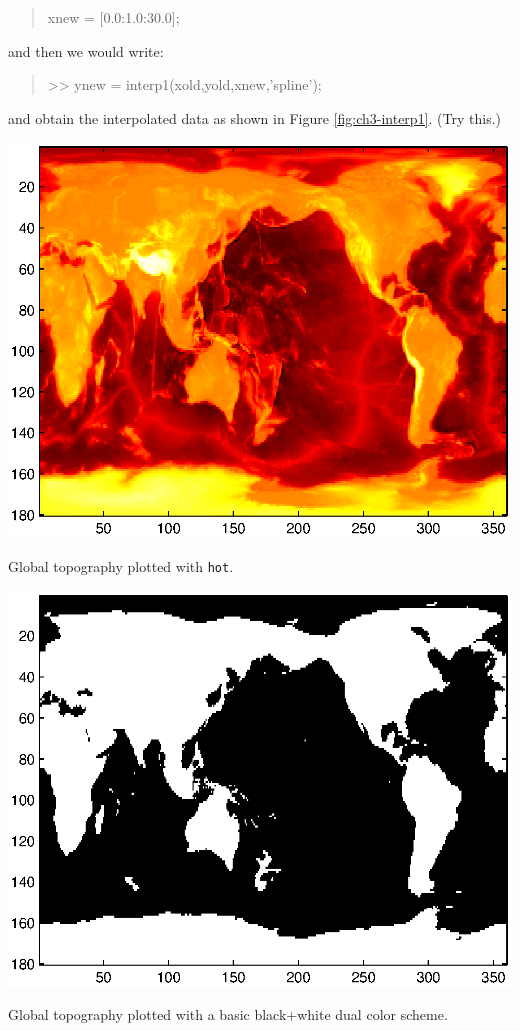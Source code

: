 \documentclass{tufte-book} %
\newenvironment{docspec}{\begin{quotation}\ttfamily\parskip0pt\parindent0pt\ignorespaces}{\end{quotation}}
\begin{document}
\begin{docspec}
xnew = [0.0:1.0:30.0];
\end{docspec}

\noindent and then we would write:

\begin{docspec}
>> ynew = interp1(xold,yold,xnew,'spline');
\end{docspec}

\noindent and obtain the interpolated data as shown in Figure \ref{fig:ch3-interp1}. (Try this.)

\begin{marginfigure}[-5.0in]
\includegraphics[width=\linewidth]{ch3-etopo4.eps}
\caption{Global topography plotted with \texttt{hot}.}
\label{fig:ch3-etopo4}
\end{marginfigure}

\begin{marginfigure}[-0.0in]
\includegraphics[width=\linewidth]{ch3-etopo5.eps}
\caption{Global topography plotted with a basic black+white dual color scheme.}
\label{fig:ch3-etopo5}
\end{marginfigure}
\end{document}
